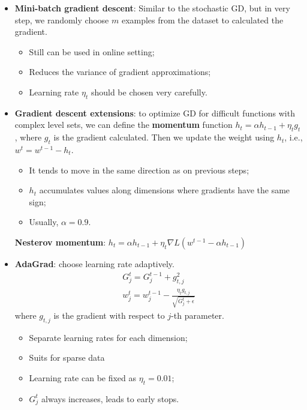 \documentclass[]{article}
\begin{document}
\begin{itemize}
\begin{itemize}
		\item \textbf{Mini-batch gradient descent}: Similar to the stochastic GD, but in very step, we randomly choose $m$ examples from the dataset to calculated the gradient.
		\begin{itemize}
			\item Still can be used in online setting;
			\item Reduces the variance of gradient approximations;
			\item Learning rate $\eta_t$ should be chosen very carefully.
		\end{itemize}
		
		\item \textbf{Gradient descent extensions}: to optimize GD for difficult functions with complex level sets, we can define the \textbf{momentum} function $h_t=\alpha h_{t-1}+\eta_tg_t$, where $g_t$ is the gradient calculated. Then we update the weight using $h_t$, i.e., $w^t=w^{t-1}-h_t$. 
		\begin{itemize}
			\item It tends to move in the same direction as on previous steps;
			\item $h_t$ accumulates values along dimensions where gradients have the same sign;
			\item Usually, $\alpha=0.9$.
		\end{itemize}
		\textbf{Nesterov momentum}: $h_t=\alpha h_{t-1} + \eta_t \nabla L(w^{t-1}-\alpha h_{t-1})$
		
		\item \textbf{AdaGrad}: choose learning rate adaptively.
		\begin{equation}
		\begin{array}{c}
		G_j^t=G_j^{t-1}+g_{t,j}^2\\
		w_j^t=w_j^{t-1}-\frac{\eta_t g_{t,j}}{\sqrt{G_j^t+\epsilon}}
		\end{array}
		\end{equation}
		where $g_{t,j}$ is the gradient with respect to $j$-th parameter.
		\begin{itemize}
			\item Separate learning rates for each dimension;
			\item Suits for sparse data
			\item Learning rate can be fixed as $\eta_t=0.01$;
			\item $G_j^t$ always increases, leads to early stops.
		\end{itemize}
		

\end{itemize}
\end{itemize}
\end{document}
